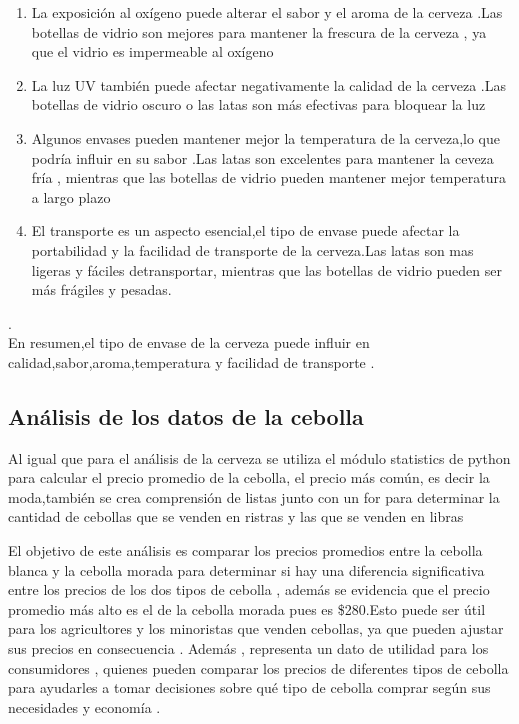 \documentclass[twocolumn,12pt]{article}
\begin{document}
\begin{enumerate}
	\item{La exposición al oxígeno puede alterar el sabor y el aroma de la cerveza .Las botellas de vidrio son mejores para mantener la frescura de la cerveza , ya que el vidrio es impermeable al oxígeno}
	\item{La luz UV también puede afectar negativamente la calidad de la cerveza .Las botellas de vidrio oscuro o las latas son más efectivas para bloquear la luz}
	\item{Algunos envases pueden mantener mejor la temperatura de la cerveza,lo que podría influir en su sabor .Las latas son excelentes para mantener la ceveza fría , mientras que las botellas de vidrio pueden mantener mejor temperatura a largo plazo}
	\item{El transporte es un aspecto esencial,el tipo de envase puede afectar la portabilidad y la facilidad de transporte de la cerveza.Las latas son mas ligeras y fáciles detransportar, mientras que las botellas de vidrio pueden ser más frágiles y pesadas}.
\end{enumerate}.\\
	
En resumen,el tipo de envase de la cerveza puede influir en calidad,sabor,aroma,temperatura y facilidad de transporte .


\subsection{Análisis de los datos de la cebolla}

Al igual que para el análisis de la cerveza se utiliza el módulo statistics de python para calcular el precio promedio de la cebolla, el precio más común, es decir la moda,también se crea comprensión de listas junto con un for para determinar la cantidad de cebollas que se venden en ristras y las que se venden en libras 



El objetivo de este análisis es comparar los precios promedios entre la cebolla blanca y la cebolla morada para determinar si hay una diferencia significativa entre los precios de los dos tipos de cebolla  , además se evidencia que el precio promedio más alto es el de la cebolla morada pues es \$280.Esto puede ser útil para los agricultores y los minoristas que venden cebollas, ya que pueden ajustar sus precios en consecuencia . Además , representa un dato de utilidad  para los consumidores , quienes pueden  comparar los precios de diferentes tipos de cebolla para ayudarles a tomar decisiones sobre qué tipo de cebolla comprar según sus necesidades y economía .\\
\end{document}
